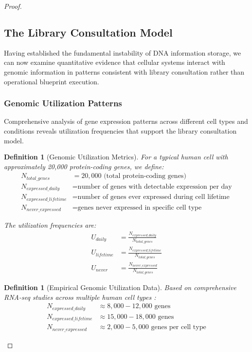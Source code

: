 \documentclass[12pt,a4paper]{article}
\newtheorem{definition}[theorem]{Definition}
\begin{document}
\begin{proof}
\subsection{The Library Consultation Model}

Having established the fundamental instability of DNA information storage, we can now examine quantitative evidence that cellular systems interact with genomic information in patterns consistent with library consultation rather than operational blueprint execution.

\subsubsection{Genomic Utilization Patterns}

Comprehensive analysis of gene expression patterns across different cell types and conditions reveals utilization frequencies that support the library consultation model.

\begin{definition}[Genomic Utilization Metrics]
For a typical human cell with approximately 20,000 protein-coding genes, we define:
\begin{align}
N_{total\_genes} &= 20,000 \text{ (total protein-coding genes)} \\
N_{expressed\_daily} &= \text{number of genes with detectable expression per day} \\
N_{expressed\_lifetime} &= \text{number of genes ever expressed during cell lifetime} \\
N_{never\_expressed} &= \text{genes never expressed in specific cell type}
\end{align}

The utilization frequencies are:
\begin{align}
U_{daily} &= \frac{N_{expressed\_daily}}{N_{total\_genes}} \\
U_{lifetime} &= \frac{N_{expressed\_lifetime}}{N_{total\_genes}} \\
U_{never} &= \frac{N_{never\_expressed}}{N_{total\_genes}}
\end{align}
\end{definition}

\begin{definition}[Empirical Genomic Utilization Data]
Based on comprehensive RNA-seq studies across multiple human cell types \cite{encode2012integrated}:
\begin{align}
N_{expressed\_daily} &\approx 8,000-12,000 \text{ genes} \\
N_{expressed\_lifetime} &\approx 15,000-18,000 \text{ genes} \\
N_{never\_expressed} &\approx 2,000-5,000 \text{ genes per cell type}
\end{align}


\end{definition}
\end{proof}
\end{document}
